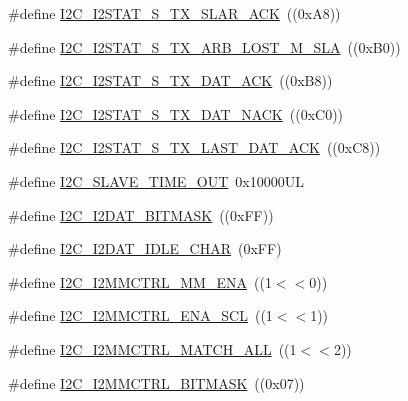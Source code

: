 \begin{DoxyCompactItemize}
\item 
\#define \hyperlink{group___i2_c___private___macros_gae6dcbdd1f01f7ebf3595722770e3b7b6}{I2\+C\+\_\+\+I2\+S\+T\+A\+T\+\_\+\+S\+\_\+\+T\+X\+\_\+\+S\+L\+A\+R\+\_\+\+A\+CK}~((0x\+A8))
\item 
\#define \hyperlink{group___i2_c___private___macros_gac71ac23a80e1bdb700a2c37170031107}{I2\+C\+\_\+\+I2\+S\+T\+A\+T\+\_\+\+S\+\_\+\+T\+X\+\_\+\+A\+R\+B\+\_\+\+L\+O\+S\+T\+\_\+\+M\+\_\+\+S\+LA}~((0x\+B0))
\item 
\#define \hyperlink{group___i2_c___private___macros_gaeb92fe85cc3f6c813cb91685234ac08c}{I2\+C\+\_\+\+I2\+S\+T\+A\+T\+\_\+\+S\+\_\+\+T\+X\+\_\+\+D\+A\+T\+\_\+\+A\+CK}~((0x\+B8))
\item 
\#define \hyperlink{group___i2_c___private___macros_gad9cdcd8c06924252a2ad9baced97d838}{I2\+C\+\_\+\+I2\+S\+T\+A\+T\+\_\+\+S\+\_\+\+T\+X\+\_\+\+D\+A\+T\+\_\+\+N\+A\+CK}~((0x\+C0))
\item 
\#define \hyperlink{group___i2_c___private___macros_ga3e4522387958da1da6017a6e48a0daad}{I2\+C\+\_\+\+I2\+S\+T\+A\+T\+\_\+\+S\+\_\+\+T\+X\+\_\+\+L\+A\+S\+T\+\_\+\+D\+A\+T\+\_\+\+A\+CK}~((0x\+C8))
\item 
\#define \hyperlink{group___i2_c___private___macros_ga33116b352c72ef28879812c66387f17a}{I2\+C\+\_\+\+S\+L\+A\+V\+E\+\_\+\+T\+I\+M\+E\+\_\+\+O\+UT}~0x10000\+UL
\item 
\#define \hyperlink{group___i2_c___private___macros_gac66b7c81c93cc59f69d204b4eb7d639b}{I2\+C\+\_\+\+I2\+D\+A\+T\+\_\+\+B\+I\+T\+M\+A\+SK}~((0x\+F\+F))
\item 
\#define \hyperlink{group___i2_c___private___macros_ga5b04af302e0e4007df123dff0328ac5e}{I2\+C\+\_\+\+I2\+D\+A\+T\+\_\+\+I\+D\+L\+E\+\_\+\+C\+H\+AR}~(0x\+F\+F)
\item 
\#define \hyperlink{group___i2_c___private___macros_ga8dc8fa566a5113c3e1b35c0580d90d9f}{I2\+C\+\_\+\+I2\+M\+M\+C\+T\+R\+L\+\_\+\+M\+M\+\_\+\+E\+NA}~((1$<$$<$0))
\item 
\#define \hyperlink{group___i2_c___private___macros_gabf11567c27c48d795ba0f92cf636dab6}{I2\+C\+\_\+\+I2\+M\+M\+C\+T\+R\+L\+\_\+\+E\+N\+A\+\_\+\+S\+CL}~((1$<$$<$1))
\item 
\#define \hyperlink{group___i2_c___private___macros_gac7dd5efba503dd79c6b42f3575f70307}{I2\+C\+\_\+\+I2\+M\+M\+C\+T\+R\+L\+\_\+\+M\+A\+T\+C\+H\+\_\+\+A\+LL}~((1$<$$<$2))
\item 
\#define \hyperlink{group___i2_c___private___macros_gadca0b6beb066a8f6689960c687334ac2}{I2\+C\+\_\+\+I2\+M\+M\+C\+T\+R\+L\+\_\+\+B\+I\+T\+M\+A\+SK}~((0x07))
$$
\end{DoxyCompactItemize}
